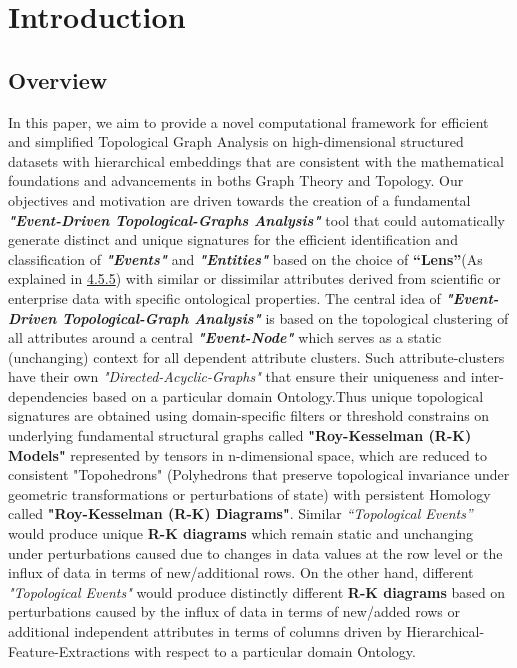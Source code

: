 \section{Introduction}

\subsection{Overview}
In this paper, we aim to provide a novel computational framework for efficient and simplified Topological Graph Analysis \cite{01.3_2016TDANewOpportunities} \cite{01.6_GTIntro} \cite{17.1_2012foundationsTGT} \cite{17.3_1996topologicalGT} \cite{17.4_TGTRecentResults}on high-dimensional structured datasets with hierarchical embeddings that are consistent with the mathematical foundations and advancements in boths Graph Theory \cite{01.8_ModernGT} and Topology.\cite{01.1_1stCourse2018algebraicTopo} Our objectives and motivation are driven towards the creation of a fundamental \textbf{\textit{"Event-Driven Topological-Graphs Analysis"}} tool that could automatically generate distinct and unique signatures for the efficient identification and classification of \textbf{\textit{"Events"}} and \textbf{\textit{"Entities"}} based on the choice of \textbf{``Lens''}(As explained in \hyperref[sec:sectionlens]{4.5.5}) with similar or dissimilar attributes derived from scientific or enterprise data with specific ontological properties. The central idea of \textbf{\textit{"Event-Driven Topological-Graph Analysis"}} is based on the topological clustering \cite{04.0_1975clusteringbook} \cite{06.1_carlsson2008persistentHomo} of all attributes around a central \textbf{\textit{"Event-Node"}} which serves as a static (unchanging) context for all dependent  attribute clusters. Such attribute-clusters have their own \textit{"Directed-Acyclic-Graphs"} \cite{20.0_2013AlgebraOfDAGs} \cite{20.1_2001DAGMechanics} that ensure their uniqueness and inter-dependencies based on a particular domain Ontology.Thus unique topological signatures are obtained using domain-specific filters or threshold constrains on underlying fundamental structural graphs called \textbf{"Roy-Kesselman (R-K) Models"} represented by tensors in n-dimensional space, which are reduced to consistent "Topohedrons" (Polyhedrons that preserve topological invariance under geometric transformations or perturbations of state) with persistent Homology called  \textbf{"Roy-Kesselman (R-K) Diagrams"}.  Similar \textit{``Topological Events''} would produce unique \textbf{R-K diagrams} which remain static and unchanging under perturbations caused due to changes in data values at the row level or the influx of data in terms of new/additional rows. On the other hand, different \textit{"Topological  Events"} would produce distinctly different \textbf{R-K diagrams} based on perturbations caused by  the influx of data in terms of new/added rows or additional independent attributes in terms of columns driven by Hierarchical-Feature-Extractions with respect to a particular domain Ontology.

